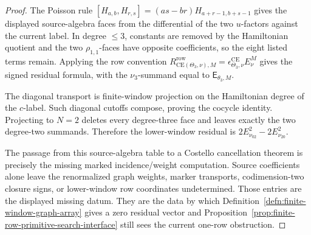 \begin{proof}
  The Poisson rule
  \([H_{a,b},H_{r,s}]=(as-br)H_{a+r-1,b+s-1}\) gives the displayed
  source-algebra faces from the differential of the two \(u\)-factors
  against the current label.  In degree \(\leq3\), constants are removed by
  the Hamiltonian quotient and the two \(\rho_{1,1}\)-faces have opposite
  coefficients, so the eight listed terms remain.  Applying the row
  convention
  \(R^{\mathrm{row}}_{\mathrm{CE}(\Theta_3,\nu),M}
  =\epsilon^{\mathrm{CE}}_{\Theta_3,\nu}E^M_\nu\) gives the signed residual
  formula, with the \(\nu_3\)-summand equal to
  \(\mathsf E_{\theta_3,M}\).

  The diagonal transport is finite-window projection on the Hamiltonian
  degree of the \(c\)-label.  Such diagonal cutoffs compose, proving the
  cocycle identity.  Projecting to \(N=2\) deletes every degree-three face
  and leaves exactly the two degree-two summands.  Therefore the lower-window
  residual is \(2E^2_{\nu_{02}}-2E^2_{\nu_{20}}\).

  The passage from this source-algebra table to a Costello cancellation
  theorem is precisely the missing marked incidence/weight computation.
  Source coefficients alone leave the renormalized graph weights,
  marker transports, codimension-two closure signs, or lower-window row
  coordinates undetermined.  Those entries are the displayed missing
  datum.  They are the data by which
  Definition~\ref{defn:finite-window-graph-array} gives a zero
  residual vector and Proposition~\ref{prop:finite-row-primitive-search-interface}
  still sees the current one-row obstruction.
\end{proof}

